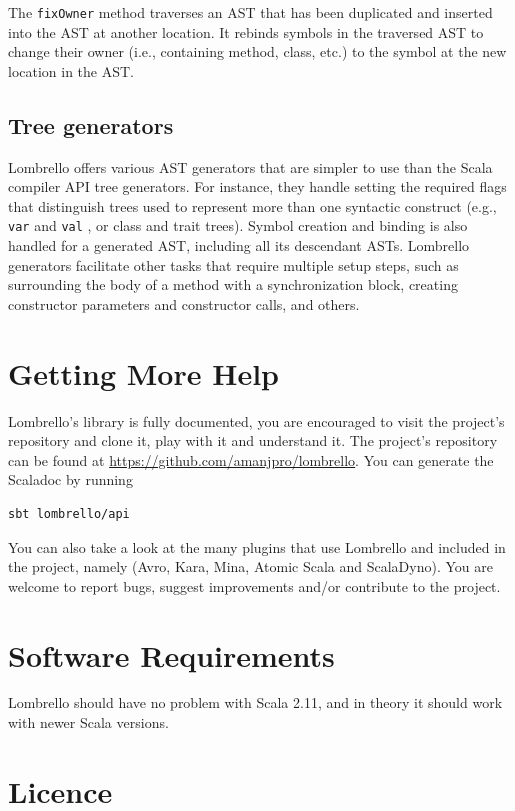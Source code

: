 \documentclass{article}
\renewcommand\c[1]{
  \ifmmode
    \text{#1}
  \else
    \lstinline{#1}
  \fi
}
\begin{document}
The \c{fixOwner} method traverses an AST that has been duplicated and inserted
into the AST at another location. It rebinds symbols in the traversed AST to
change their owner (i.e., containing method, class, etc.) to the symbol at the
new location in the AST.

\subsection{Tree generators}

Lombrello offers various AST generators that are simpler to use than the Scala
compiler API tree generators.  For instance, they handle setting the required
flags that distinguish trees used to represent more than one syntactic
construct (e.g., \c{var} and \c{val}, or class and trait trees). Symbol
creation and binding is also handled for a generated AST, including all its
descendant ASTs.  Lombrello generators facilitate other tasks that require
multiple setup steps, such as surrounding the body of a method with a
synchronization block, creating constructor parameters and constructor calls,
and others. 

\section{Getting More Help}
Lombrello's library is fully documented, you are encouraged to visit the
project's repository and clone it, play with it and understand it.  The
project's repository can be found at
\url{https://github.com/amanjpro/lombrello}. You can generate the Scaladoc by
running

\begin{verbatim}
sbt lombrello/api
\end{verbatim}

You can also take a look at the many plugins that use Lombrello and included in
the project, namely (Avro, Kara, Mina, Atomic Scala and ScalaDyno). You are
welcome to report bugs, suggest improvements and/or contribute to the project.


\section{Software Requirements}
Lombrello should have no problem with Scala 2.11, and in theory it should work 
with newer Scala versions.


\section{Licence}
\end{document}
